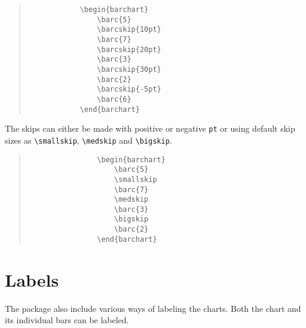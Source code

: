 \documentclass[]{article}
\begin{document}
\begin{center}
	\begin{minipage}[l][][c]{0.45\linewidth} 
		\begin{quote}\small
			\begin{verbatim}
			\begin{barchart}
			    \barc{5}
			    \barcskip{10pt}
			    \barc{7}
			    \barcskip{20pt}
			    \barc{3}
			    \barcskip{30pt}
			    \barc{2}
			    \barcskip{-5pt}
			    \barc{6}
			\end{barchart}
			\end{verbatim}
		\end{quote}
	\end{minipage}
	\quad
	\begin{minipage}[r][][c]{0.45\linewidth}
		\begin{barchart}
			\barcskip{10pt}
			\barcskip{20pt}
			\barcskip{30pt}
			\barcskip{-5pt}
		\end{barchart}
	\end{minipage}
\end{center}

The skips can either be made with positive or negative \texttt{pt} or using default skip sizes as \texttt{\textbackslash smallskip}, \texttt{\textbackslash medskip} and \texttt{\textbackslash bigskip}. 

\begin{center}
	\begin{minipage}[l][][c]{0.45\linewidth} 
		\begin{quote}\small
			\begin{verbatim}
				\begin{barchart}
				    \barc{5}
				    \smallskip
				    \barc{7}
				    \medskip
				    \barc{3}
				    \bigskip
				    \barc{2}
				\end{barchart}
			\end{verbatim}
		\end{quote}
	\end{minipage}
	\quad
	\begin{minipage}[r][][c]{0.45\linewidth}
		\begin{barchart}
			\barc{5}
			\smallskip
			\medskip
			\bigskip
		\end{barchart}
	\end{minipage}
\end{center}


\section{Labels}
The package also include various ways of labeling the charts. Both the chart and its individual bars can be labeled. 
\end{document}
